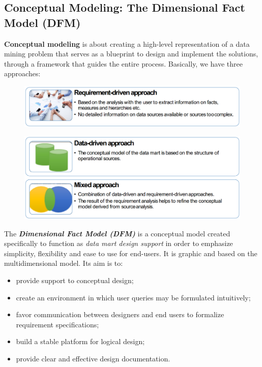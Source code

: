 \subsection{Conceptual Modeling: The Dimensional Fact Model (DFM)}

\textbf{Conceptual modeling} is about creating a high-level representation of a data mining problem that serves as a blueprint to design and implement the solutions, through a framework that guides the entire process. Basically, we have three approaches:
\begin{figure}[ht!]
    \centering
    \includegraphics[scale=0.4]{images/conceptual_modeling_1.png}
\end{figure}
\begin{figure}[ht!]
    \centering
    \includegraphics[scale=0.4]{images/conceptual_modeling_2.png}
\end{figure}

The \textbf{\textit{Dimensional Fact Model (DFM)}} is a conceptual model created specifically to function as \textit{data mart design support} in order to emphasize simplicity, flexibility and ease to use for end-users. It is graphic and based on the multidimensional model. Its aim is to:
\begin{itemize}
    \item provide support to conceptual design;
    \item create an environment in which user queries may be formulated intuitively;
    \item favor communication between designers and end users to formalize requirement specifications;
    \item build a stable platform for logical design;
    \item provide clear and effective design documentation.
\end{itemize}

